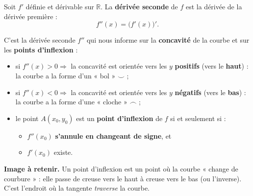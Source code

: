 \documentclass[11pt,a4paper]{article}
\newcommand{\R}{\mathbb{R}}
\begin{document}
\begin{definition}
Soit $f'$ définie et dérivable sur $\R$. La \textbf{dérivée seconde} de $f$ est la dérivée de la
dérivée première :
\[
   f''(x)=\big(f'(x)\big)'.
\]
\end{definition}

\begin{theoreme}
C'est la dérivée seconde $f''$ qui nous informe sur la \textbf{concavité} de la courbe et sur les
\textbf{points d'inflexion} :
\begin{itemize}[leftmargin=1.7em,topsep=3pt,itemsep=2pt]
  \item si $f''(x)>0 \Rightarrow$ la concavité est orientée vers les $y$ \textbf{positifs}
        (vers le \textbf{haut}) : la courbe a la forme d'un « bol » $\smallsmile$ ;
  \item si $f''(x)<0 \Rightarrow$ la concavité est orientée vers les $y$ \textbf{négatifs}
        (vers le \textbf{bas}) : la courbe a la forme d'une « cloche » $\smallfrown$ ;
  \item le point $A(x_0,y_0)$ est un \textbf{point d'inflexion} de $f$ si et seulement si :
        \begin{itemize}[leftmargin=1.5em,topsep=2pt,itemsep=1pt]
          \item $f''(x_0)$ \textbf{s'annule en changeant de signe}, et
          \item $f'(x_0)$ existe.
        \end{itemize}
\end{itemize}
\end{theoreme}

\noindent \textbf{Image à retenir.} Un point d'inflexion est un point où la courbe « change de
courbure » : elle passe de creuse vers le haut à creuse vers le bas (ou l'inverse). C'est l'endroit
où la tangente \emph{traverse} la courbe.
\end{document}
